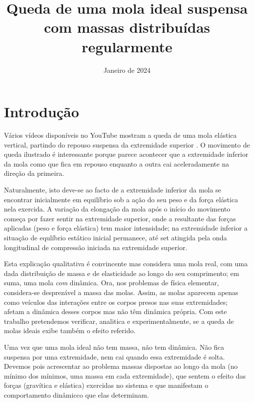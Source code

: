 \documentclass{article}
\title{Queda de uma mola ideal suspensa com massas distribuídas regularmente}
\author{}
\date{Janeiro de 2024}
\begin{document}
\maketitle

\section{Introdução}
Vários vídeos disponíveis no YouTube mostram a queda de uma mola elástica
vertical, partindo do repouso suspensa da extremidade superior
\cite{ytvid1,ytvid2}. O movimento de queda
ilustrado é interessante porque parece acontecer que a extremidade inferior da
mola como que fica em repouso enquanto a outra cai aceleradamente na direção da
primeira.

Naturalmente, isto deve-se ao facto de a extremidade inferior da mola se
encontrar inicialmente em equilíbrio sob a ação do seu peso e da força elástica
nela exercida. A variação da elongação da mola após o início do movimento começa
por fazer sentir na extremidade superior, onde a resultante das forças aplicadas
(peso e força elástica) tem maior intensidade; na extremidade inferior a
situação de equlíbrio estático inicial permanece, até set atingida pela onda
longitudinal de compressão iniciada na extremidade superior.

Esta explicação qualitativa é convincente mas considera uma mola real, com uma
dada distribuição de massa e de elasticidade ao longo do seu comprimento; em
suma, uma mola \emph{com} dinâmica. Ora, nos problemas de física elementar,
considera-se desprezável a massa das molas. Assim, as molas aparecem apenas como
veículos das interações entre os corpos presos nas suas extremidades; afetam a
dinâmica desses corpos mas não têm dinâmica própria. Com este trabalho
pretendemos verificar, analitica e experimentalmente, se a queda de molas ideais
exibe também o efeito referido.

Uma vez que uma mola ideal não tem massa, não tem dinâmica. Não fica suspensa
por uma extremidade, nem cai quando essa extremidade é solta. Devemos pois
acrescentar ao problema massas dispostas ao longo da mola (no mínimo dos
mínimos, uma massa em cada extremidade), que sentem o efeito das forças
(gravítica e elástica) exercidas no sistema e que manifestam o comportamento
dinâmicco que elas determinam. 
\end{document}
